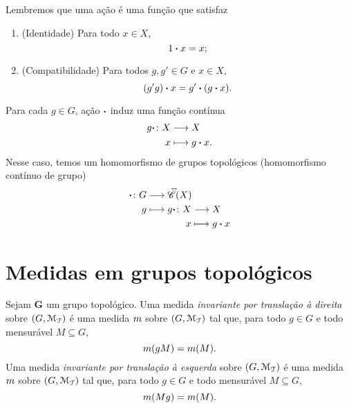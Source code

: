 Lembremos que uma ação é uma função que satisfaz
	\begin{enumerate}
	\item (Identidade) Para todo $x \in X$,
		\begin{equation*}
		1\bm{\cdot} x = x;
		\end{equation*}
	\item (Compatibilidade) Para todos $g,g' \in G$ e $x \in X$,
		\begin{equation*}
		(g'g)\bm{\cdot} x = g'\bm{\cdot}(g\bm{\cdot} x).
		\end{equation*}
	\end{enumerate}

Para cada $g \in G$, ação $\bm{\cdot}$ induz uma função contínua
	\begin{align*}
	{g\bm{\cdot}}\colon {X} &\longrightarrow {X} \\{x} &\longmapsto g\bm{\cdot} x.
	\end{align*}
Nesse caso, temos um homomorfismo de grupos topológicos (homomorfismo contínuo de grupo)
	\begin{align*}
	\func{\pt}{G}{\Iso{\Cont}(X)}{g}{
		\begin{aligned}[t]
		\func{g\pt}{X}{X}{x}{g\pt x}
		\end{aligned}
	}
	\end{align*}

\begin{comment}

\begin{proof}
\begin{enumerate}
	\item [($\Rightarrow$)] Suponhamos que a ação $\fun{\varphi}{G \times X}{X}$ seja contínua e mostremos que a ação $\fun{\phi}{G}{\Iso{\Cont}(X)}$ é contínua. Para isso,

	\item [($\Leftarrow$)]
\end{enumerate}
\end{proof}

\end{comment}











\section{Medidas em grupos topológicos}

\begin{definition}
Sejam $\bm G$ um grupo topológico. Uma medida \emph{invariante por translação à direita} sobre $(G,\mathcal{M}_{\mathcal{T}})$ é uma medida $m$ sobre $(G,\mathcal{M}_{\mathcal{T}})$ tal que, para todo $g \in G$ e todo mensurável $M \subseteq G$,
	\begin{equation*}
	m(gM) = m(M).
	\end{equation*}
Uma medida \emph{invariante por translação à esquerda} sobre $(G,\mathcal{M}_{\mathcal{T}})$ é uma medida $m$ sobre $(G,\mathcal{M}_{\mathcal{T}})$ tal que, para todo $g \in G$ e todo mensurável $M \subseteq G$,
	\begin{equation*}
	m(Mg) = m(M).
	\end{equation*}
\end{definition}

